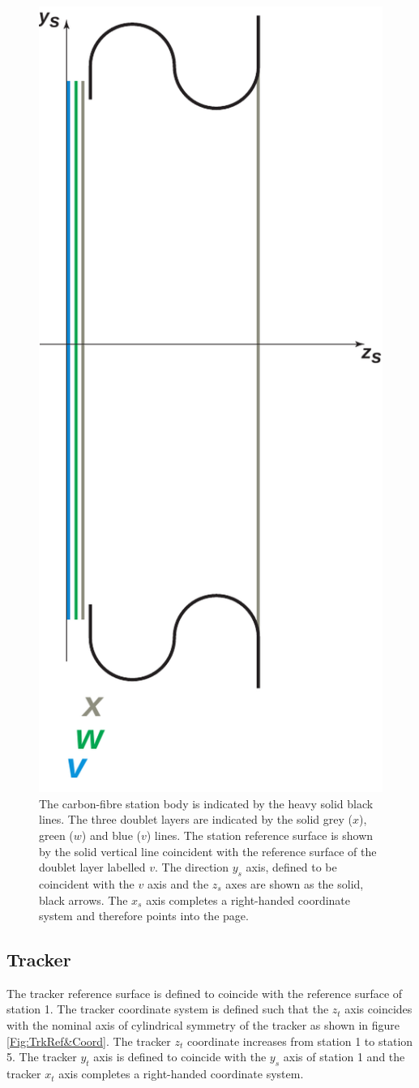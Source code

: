 \begin{figure}
  \begin{center}
    \includegraphics[width=0.22\linewidth]{detectors/tracker/03-Reference-surfaces-and-coordinate-systems/Figures/station.pdf}
  \end{center}
  \caption{ The carbon-fibre station body is indicated by the heavy solid black lines. The three doublet layers are indicated by the solid grey ($x$), green ($w$) and blue ($v$) lines. The station reference surface is shown by the solid vertical line coincident with the reference surface of the doublet layer labelled $v$. The direction $y_s$ axis, defined to be coincident with the $v$ axis and the $z_s$ axes are shown as the solid, black arrows. The $x_s$ axis completes a right-handed coordinate system and therefore points into the page. }
  \label{Fig:StnRef&Coord}
\end{figure}

\subsection{Tracker}
\label{SubSect:TrkrCoordStn}

The tracker reference surface is defined to coincide with the reference surface of station 1. The tracker coordinate system is defined such that the $z_t$ axis coincides with the nominal axis of cylindrical symmetry of the tracker as shown in figure \ref{Fig:TrkRef&Coord}. The tracker $z_t$ coordinate increases from station 1 to station 5. The tracker $y_t$ axis is defined to coincide with the $y_s$ axis of station 1 and the tracker $x_t$ axis completes a right-handed coordinate system.

